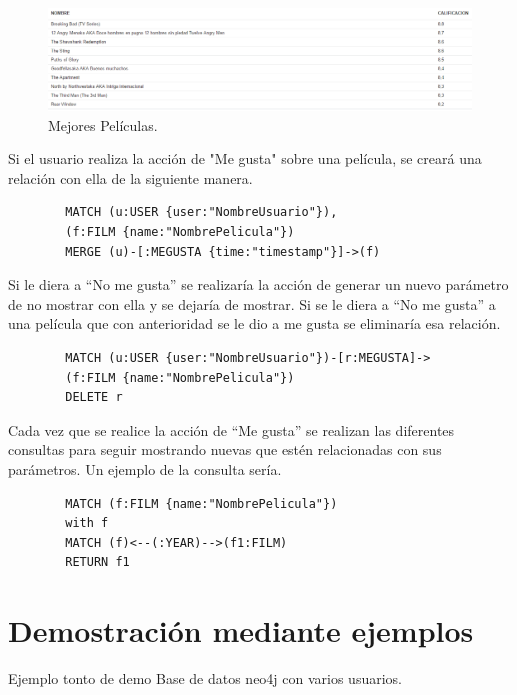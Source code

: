 \documentclass[12pt,a4paper]{article}
\begin{document}
		\begin{figure}[tbph!]
		\centering
		\includegraphics[width=0.9\linewidth]{images/BestFilms}
		\caption{Mejores Películas.}
		\label{fig:MejoresPeliculas}
		\end{figure}
		
		Si el usuario realiza la acción de "Me gusta" sobre una película, se creará una relación con ella de la siguiente manera.
		
		\begin{verbatim}
		MATCH (u:USER {user:"NombreUsuario"}), 
		(f:FILM {name:"NombrePelicula"}) 
		MERGE (u)-[:MEGUSTA {time:"timestamp"}]->(f)
		\end{verbatim}
		
		Si le diera a ``No me gusta'' se realizaría la acción de generar un nuevo parámetro de no mostrar con ella y se dejaría de mostrar.
		Si se le diera a ``No me gusta'' a una película que con anterioridad se le dio a me gusta se eliminaría esa relación.\\
		
		\begin{verbatim}
		MATCH (u:USER {user:"NombreUsuario"})-[r:MEGUSTA]-> 
		(f:FILM {name:"NombrePelicula"}) 
		DELETE r
		\end{verbatim}
		
		Cada vez que se realice la acción de ``Me gusta'' se realizan las diferentes consultas para seguir mostrando nuevas que estén relacionadas con sus parámetros. Un ejemplo de la consulta sería.\\
		
		\begin{verbatim}
		MATCH (f:FILM {name:"NombrePelicula"})
		with f
		MATCH (f)<--(:YEAR)-->(f1:FILM) 
		RETURN f1
		\end{verbatim}
		\clearpage
		\section{Demostración mediante ejemplos}
		Ejemplo tonto de demo
		Base de datos neo4j con varios usuarios.
	
\end{document}
